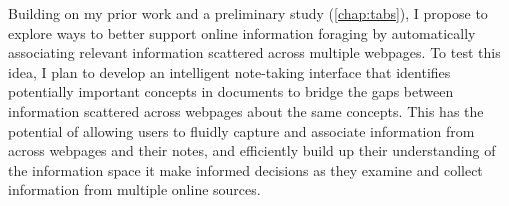 Building on my prior work and a preliminary study (\cref{chap:tabs}), I propose to explore ways to better support online information foraging by automatically associating relevant information scattered across multiple webpages. To test this idea, I plan to develop an intelligent note-taking interface that identifies potentially important concepts in documents to bridge the gaps between information scattered across webpages about the same concepts. This has the potential of allowing users to fluidly capture and associate information from across webpages and their notes, and efficiently build up their understanding of the information space it make informed decisions as they examine and collect information from multiple online sources.

